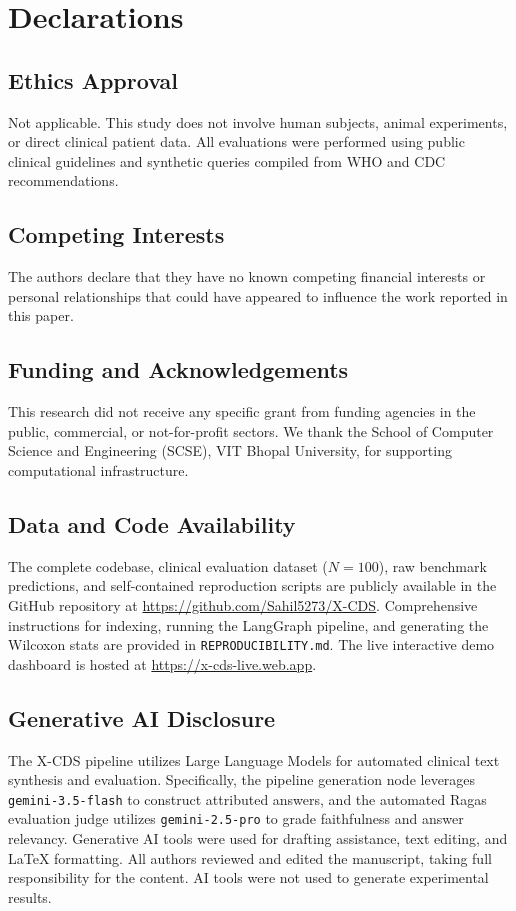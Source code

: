 \section*{Declarations}\label{sec:declarations}

\subsection*{Ethics Approval}
Not applicable. This study does not involve human subjects, animal experiments, or direct clinical patient data. All evaluations were performed using public clinical guidelines and synthetic queries compiled from WHO and CDC recommendations.

\subsection*{Competing Interests}
The authors declare that they have no known competing financial interests or personal relationships that could have appeared to influence the work reported in this paper.

\subsection*{Funding and Acknowledgements}
This research did not receive any specific grant from funding agencies in the public, commercial, or not-for-profit sectors. We thank the School of Computer Science and Engineering (SCSE), VIT Bhopal University, for supporting computational infrastructure.

\subsection*{Data and Code Availability}
The complete codebase, clinical evaluation dataset ($N=100$), raw benchmark predictions, and self-contained reproduction scripts are publicly available in the GitHub repository at \url{https://github.com/Sahil5273/X-CDS}. Comprehensive instructions for indexing, running the LangGraph pipeline, and generating the Wilcoxon stats are provided in \texttt{REPRODUCIBILITY.md}. The live interactive demo dashboard is hosted at \url{https://x-cds-live.web.app}.

\subsection*{Generative AI Disclosure}
The X-CDS pipeline utilizes Large Language Models for automated clinical text synthesis and evaluation. Specifically, the pipeline generation node leverages \texttt{gemini-3.5-flash} to construct attributed answers, and the automated Ragas evaluation judge utilizes \texttt{gemini-2.5-pro} to grade faithfulness and answer relevancy. Generative AI tools were used for drafting assistance, text editing, and LaTeX formatting. All authors reviewed and edited the manuscript, taking full responsibility for the content. AI tools were not used to generate experimental results.

